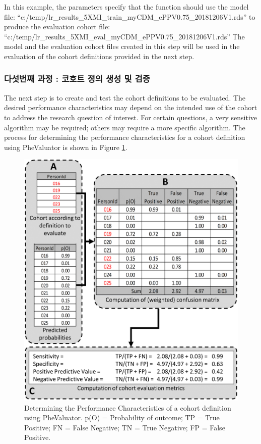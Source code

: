 \documentclass[11pt]{book}
\theoremstyle{definition}
\theoremstyle{definition}
\theoremstyle{definition}
\theoremstyle{remark}
\begin{document}
In this example, the parameters specify that the function should use the
model file:
``c:/temp/lr\_results\_5XMI\_train\_myCDM\_ePPV0.75\_20181206V1.rds'' to
produce the evaluation cohort file:
``c:/temp/lr\_results\_5XMI\_eval\_myCDM\_ePPV0.75\_20181206V1.rds'' The
model and the evaluation cohort files created in this step will be used
in the evaluation of the cohort definitions provided in the next step.

\subsubsection*{다섯번째 과정 : 코호트 정의 생성 및 검증}\label{------}

The next step is to create and test the cohort definitions to be
evaluated. The desired performance characteristics may depend on the
intended use of the cohort to address the research question of interest.
For certain questions, a very sensitive algorithm may be required;
others may require a more specific algorithm. The process for
determining the performance characteristics for a cohort definition
using PheValuator is shown in Figure \ref{fig:phevaluatorDiagram}.

\begin{figure}

{\centering \includegraphics[width=1\linewidth]{images/ClinicalValidity/PheValuatorEvaluation} 

}

\caption{Determining the Performance Characteristics of a cohort definition using PheValuator. p(O) = Probability of outcome; TP = True Positive; FN = False Negative; TN = True Negative; FP = False Positive.}\label{fig:phevaluatorDiagram}
\end{figure}
\end{document}
